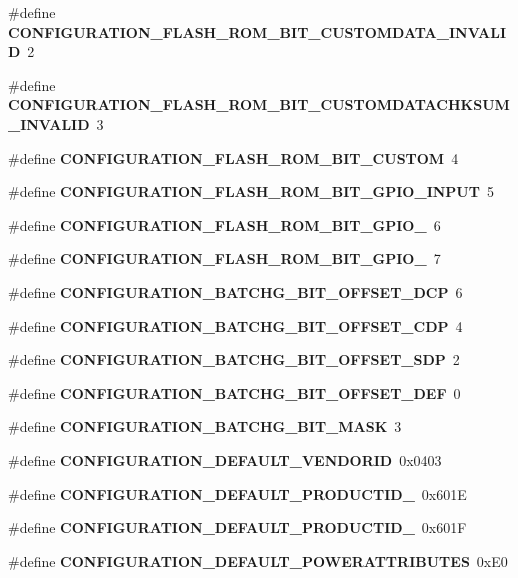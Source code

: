 \begin{DoxyCompactItemize}
\item 
\#define {\bf C\+O\+N\+F\+I\+G\+U\+R\+A\+T\+I\+O\+N\+\_\+\+F\+L\+A\+S\+H\+\_\+\+R\+O\+M\+\_\+\+B\+I\+T\+\_\+\+C\+U\+S\+T\+O\+M\+D\+A\+T\+A\+\_\+\+I\+N\+V\+A\+L\+ID}~2
\item 
\#define {\bf C\+O\+N\+F\+I\+G\+U\+R\+A\+T\+I\+O\+N\+\_\+\+F\+L\+A\+S\+H\+\_\+\+R\+O\+M\+\_\+\+B\+I\+T\+\_\+\+C\+U\+S\+T\+O\+M\+D\+A\+T\+A\+C\+H\+K\+S\+U\+M\+\_\+\+I\+N\+V\+A\+L\+ID}~3
\item 
\#define {\bf C\+O\+N\+F\+I\+G\+U\+R\+A\+T\+I\+O\+N\+\_\+\+F\+L\+A\+S\+H\+\_\+\+R\+O\+M\+\_\+\+B\+I\+T\+\_\+\+C\+U\+S\+T\+OM}~4
\item 
\#define {\bf C\+O\+N\+F\+I\+G\+U\+R\+A\+T\+I\+O\+N\+\_\+\+F\+L\+A\+S\+H\+\_\+\+R\+O\+M\+\_\+\+B\+I\+T\+\_\+\+G\+P\+I\+O\+\_\+\+I\+N\+P\+UT}~5
\item 
\#define {\bf C\+O\+N\+F\+I\+G\+U\+R\+A\+T\+I\+O\+N\+\_\+\+F\+L\+A\+S\+H\+\_\+\+R\+O\+M\+\_\+\+B\+I\+T\+\_\+\+G\+P\+I\+O\+\_}~6
\item 
\#define {\bf C\+O\+N\+F\+I\+G\+U\+R\+A\+T\+I\+O\+N\+\_\+\+F\+L\+A\+S\+H\+\_\+\+R\+O\+M\+\_\+\+B\+I\+T\+\_\+\+G\+P\+I\+O\+\_}~7
\item 
\#define {\bf C\+O\+N\+F\+I\+G\+U\+R\+A\+T\+I\+O\+N\+\_\+\+B\+A\+T\+C\+H\+G\+\_\+\+B\+I\+T\+\_\+\+O\+F\+F\+S\+E\+T\+\_\+\+D\+CP}~6
\item 
\#define {\bf C\+O\+N\+F\+I\+G\+U\+R\+A\+T\+I\+O\+N\+\_\+\+B\+A\+T\+C\+H\+G\+\_\+\+B\+I\+T\+\_\+\+O\+F\+F\+S\+E\+T\+\_\+\+C\+DP}~4
\item 
\#define {\bf C\+O\+N\+F\+I\+G\+U\+R\+A\+T\+I\+O\+N\+\_\+\+B\+A\+T\+C\+H\+G\+\_\+\+B\+I\+T\+\_\+\+O\+F\+F\+S\+E\+T\+\_\+\+S\+DP}~2
\item 
\#define {\bf C\+O\+N\+F\+I\+G\+U\+R\+A\+T\+I\+O\+N\+\_\+\+B\+A\+T\+C\+H\+G\+\_\+\+B\+I\+T\+\_\+\+O\+F\+F\+S\+E\+T\+\_\+\+D\+EF}~0
\item 
\#define {\bf C\+O\+N\+F\+I\+G\+U\+R\+A\+T\+I\+O\+N\+\_\+\+B\+A\+T\+C\+H\+G\+\_\+\+B\+I\+T\+\_\+\+M\+A\+SK}~3
\item 
\#define {\bf C\+O\+N\+F\+I\+G\+U\+R\+A\+T\+I\+O\+N\+\_\+\+D\+E\+F\+A\+U\+L\+T\+\_\+\+V\+E\+N\+D\+O\+R\+ID}~0x0403
\item 
\#define {\bf C\+O\+N\+F\+I\+G\+U\+R\+A\+T\+I\+O\+N\+\_\+\+D\+E\+F\+A\+U\+L\+T\+\_\+\+P\+R\+O\+D\+U\+C\+T\+I\+D\+\_}~0x601E
\item 
\#define {\bf C\+O\+N\+F\+I\+G\+U\+R\+A\+T\+I\+O\+N\+\_\+\+D\+E\+F\+A\+U\+L\+T\+\_\+\+P\+R\+O\+D\+U\+C\+T\+I\+D\+\_}~0x601F
\item 
\#define {\bf C\+O\+N\+F\+I\+G\+U\+R\+A\+T\+I\+O\+N\+\_\+\+D\+E\+F\+A\+U\+L\+T\+\_\+\+P\+O\+W\+E\+R\+A\+T\+T\+R\+I\+B\+U\+T\+ES}~0x\+E0

\end{DoxyCompactItemize}
